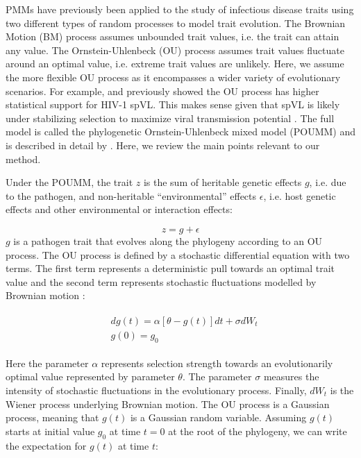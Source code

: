 \documentclass[11pt]{article}
\begin{document}
\begin{linenumbers}
PMMs have previously been applied to the study of infectious disease traits using two different types of random processes to model trait evolution. The Brownian Motion (BM) process assumes unbounded trait values, i.e. the trait can attain any value. The Ornstein-Uhlenbeck (OU) process assumes trait values fluctuate around an optimal value, i.e. extreme trait values are unlikely. Here, we assume the more flexible OU process as it encompasses a wider variety of evolutionary scenarios. For example, \citet{Mitov2018} and \citet{Bertels2018} previously showed the OU process has higher statistical support for HIV-1 spVL. This makes sense given that spVL is likely under stabilizing selection to maximize viral transmission potential \citep{Fraser2014}. The full model is called the phylogenetic Ornstein-Uhlenbeck mixed model (POUMM) and is described in detail by \citet{Mitov2018}. Here, we review the main points relevant to our method.

Under the POUMM, the trait $z$ is the sum of heritable genetic effects $g$, i.e. due to the pathogen, and non-heritable ``environmental'' effects $\epsilon$, i.e. host genetic effects and other environmental or interaction effects: 

\begin{equation}
    z = g + \epsilon
\end{equation}
$g$ is a pathogen trait that evolves along the phylogeny according to an OU process. The OU process is defined by a stochastic differential equation with two terms. The first term represents a deterministic pull towards an optimal trait value and the second term represents stochastic fluctuations modelled by Brownian motion \citep{Butler2004}:

\begin{align}
\begin{split}
	&dg(t) = \alpha[\theta - g(t)]dt + \sigma dW_t \\
	&g(0) = g_0 
	\label{eq:OUprocess}
\end{split}
\end{align}

Here the parameter $\alpha$ represents selection strength towards an evolutionarily optimal value represented by parameter $\theta$. The parameter $\sigma$ measures the intensity of stochastic fluctuations in the evolutionary process. Finally, $dW_t$ is the Wiener process underlying Brownian motion. The OU process is a Gaussian process, meaning that $g(t)$ is a Gaussian random variable. Assuming $g(t)$ starts at initial value $g_0$ at time $t = 0$ at the root of the phylogeny, we can write the expectation for $g(t)$ at time $t$: 


\end{linenumbers}
\end{document}
